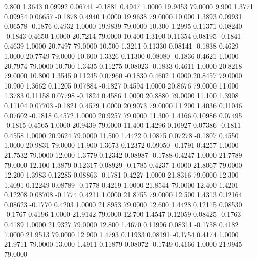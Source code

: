    9.800   1.3643   0.09992   0.06741  -0.1881   0.4947   1.0000  19.9453  79.0000
   9.900   1.3771   0.09954   0.06657  -0.1878   0.4940   1.0000  19.9638  79.0000
  10.000   1.3893   0.09931   0.06578  -0.1876   0.4932   1.0000  19.9839  79.0000
  10.300   1.2995   0.11371   0.08240  -0.1843   0.4650   1.0000  20.7214  79.0000
  10.400   1.3100   0.11354   0.08195  -0.1841   0.4639   1.0000  20.7497  79.0000
  10.500   1.3211   0.11330   0.08141  -0.1838   0.4629   1.0000  20.7749  79.0000
  10.600   1.3326   0.11300   0.08080  -0.1836   0.4621   1.0000  20.7974  79.0000
  10.700   1.3435   0.11275   0.08023  -0.1833   0.4611   1.0000  20.8218  79.0000
  10.800   1.3545   0.11245   0.07960  -0.1830   0.4602   1.0000  20.8457  79.0000
  10.900   1.3662   0.11205   0.07884  -0.1827   0.4594   1.0000  20.8676  79.0000
  11.000   1.3783   0.11158   0.07798  -0.1824   0.4586   1.0000  20.8880  79.0000
  11.100   1.3908   0.11104   0.07703  -0.1821   0.4579   1.0000  20.9073  79.0000
  11.200   1.4036   0.11046   0.07602  -0.1818   0.4572   1.0000  20.9257  79.0000
  11.300   1.4166   0.10986   0.07495  -0.1815   0.4565   1.0000  20.9439  79.0000
  11.400   1.4296   0.10927   0.07386  -0.1811   0.4558   1.0000  20.9624  79.0000
  11.500   1.4422   0.10875   0.07278  -0.1807   0.4550   1.0000  20.9831  79.0000
  11.900   1.3673   0.12372   0.09050  -0.1791   0.4257   1.0000  21.7532  79.0000
  12.000   1.3779   0.12342   0.08987  -0.1788   0.4247   1.0000  21.7789  79.0000
  12.100   1.3879   0.12317   0.08929  -0.1785   0.4237   1.0000  21.8067  79.0000
  12.200   1.3983   0.12285   0.08863  -0.1781   0.4227   1.0000  21.8316  79.0000
  12.300   1.4091   0.12249   0.08789  -0.1778   0.4219   1.0000  21.8544  79.0000
  12.400   1.4201   0.12208   0.08708  -0.1774   0.4211   1.0000  21.8755  79.0000
  12.500   1.4313   0.12164   0.08623  -0.1770   0.4203   1.0000  21.8953  79.0000
  12.600   1.4428   0.12115   0.08530  -0.1767   0.4196   1.0000  21.9142  79.0000
  12.700   1.4547   0.12059   0.08425  -0.1763   0.4189   1.0000  21.9327  79.0000
  12.800   1.4670   0.11996   0.08311  -0.1758   0.4182   1.0000  21.9513  79.0000
  12.900   1.4793   0.11933   0.08191  -0.1754   0.4174   1.0000  21.9711  79.0000
  13.000   1.4911   0.11879   0.08072  -0.1749   0.4166   1.0000  21.9945  79.0000
